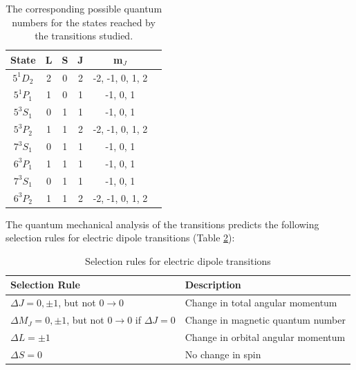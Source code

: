\documentclass[11pt]{article}
\begin{document}
\begin{table}[h!]
    \centering
    \begin{tabular}{cccccc}
        \toprule
        \textbf{State} & \textbf{L} & \textbf{S} & \textbf{J} & \textbf{m$_J$} \\
        \midrule
        $5^1 D_2$ & 2 & 0 & 2 & -2, -1, 0, 1, 2 \\
        $5^1 P_1$ & 1 & 0 & 1 & -1, 0, 1 \\
        $5^3 S_1$ & 0 & 1 & 1 & -1, 0, 1 \\
        $5^3 P_2$ & 1 & 1 & 2 & -2, -1, 0, 1, 2 \\
        $7^3 S_1$ & 0 & 1 & 1 & -1, 0, 1 \\
        $6^3 P_1$ & 1 & 1 & 1 & -1, 0, 1 \\
        $7^3 S_1$ & 0 & 1 & 1 & -1, 0, 1 \\
        $6^3 P_2$ & 1 & 1 & 2 & -2, -1, 0, 1, 2 \\
        \bottomrule
    \end{tabular}
    \captionsetup{justification=centering}
    \caption{The corresponding possible quantum numbers for the states reached by the transitions studied.}
    \label{tab: quantum_numbers}
\end{table}

The quantum mechanical analysis of the transitions predicts the following selection rules for electric dipole transitions (Table \ref{tab:selection_rules}): 
\begin{table}[h!]
    \centering
    \begin{tabular}{ll}
        \toprule
        Selection Rule & Description \\
        \midrule
        $\Delta J = 0, \pm 1$, but not $0 \rightarrow 0$ & Change in total angular momentum \\
        $\Delta M_J = 0, \pm 1$, but not $0 \rightarrow 0$ if $\Delta J = 0$ & Change in magnetic quantum number \\
        $\Delta L = \pm 1$ & Change in orbital angular momentum \\
        $\Delta S = 0$ & No change in spin \\
        \bottomrule
    \end{tabular}
    \caption{Selection rules for electric dipole transitions}
    \label{tab:selection_rules}
\end{table}
\end{document}
